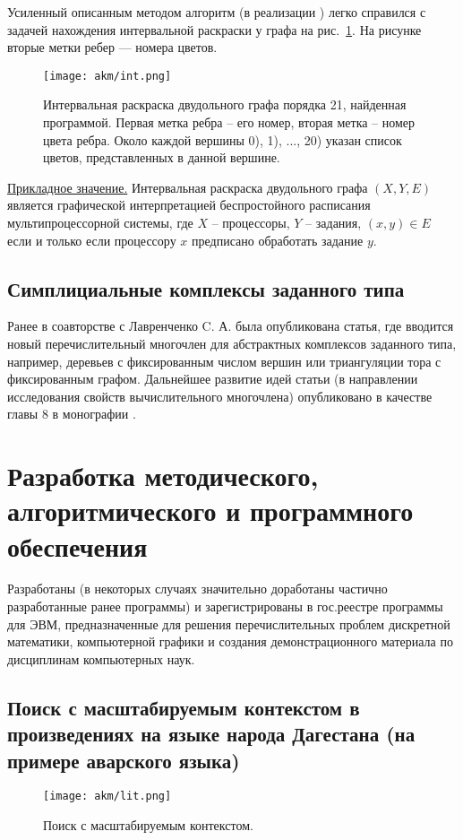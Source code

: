 Усиленный описанным методом алгоритм (в реализации \cite{akm-bib-m14, akm-bib-m15}) легко справился с задачей нахождения интервальной раскраски у графа на рис.~\ref{akm-fig-1}. На рисунке вторые метки ребер --- номера цветов.
\begin{figure}[h]
    \begin{center}
        \texttt{[image: akm/int.png]}
    \end{center}
    \caption{Интервальная раскраска двудольного графа порядка 21, найденная программой. Первая метка ребра -- его номер, вторая метка -- номер цвета ребра. Около каждой вершины 0), 1), ..., 20)  указан список цветов, представленных в данной вершине.}
    \label{akm-fig-1}
\end{figure}

\underline{Прикладное значение.} Интервальная раскраска двудольного графа $(X,Y,E)$ является графической интерпретацией беспростойного расписания мультипроцессорной системы,  где $X$ -- процессоры, $Y$ -- задания, $(x,y) \in E$ если и только если процессору $x$ предписано обработать задание $y$. 


\subsection{Симплициальные комплексы заданного типа} 

Ранее в соавторстве с Лавренченко C. А.  была опубликована статья, где вводится новый перечислительный многочлен для абстрактных комплексов заданного типа, например, деревьев с фиксированным числом вершин или триангуляции тора с фиксированным графом. 
Дальнейшее развитие идей статьи (в направлении исследования свойств вычислительного многочлена) опубликовано в качестве главы 8 в монографии \cite{akm-bib-m3}. 


\section{Разработка методического, алгоритмического и программного обеспечения}
  
Разработаны (в некоторых случаях значительно доработаны частично разработанные ранее программы) и зарегистрированы в гос.реестре программы для ЭВМ, предназначенные для решения перечислительных проблем дискретной математики, компьютерной графики и создания демонстрационного материала по дисциплинам компьютерных наук.


\subsection{Поиск с масштабируемым контекстом в произведениях на языке народа Дагестана (на примере аварского языка)}
\begin{figure}[h]
    \begin{center}
        \texttt{[image: akm/lit.png]}
    \end{center}
    \caption{Поиск с масштабируемым контекстом.}
\end{figure}

